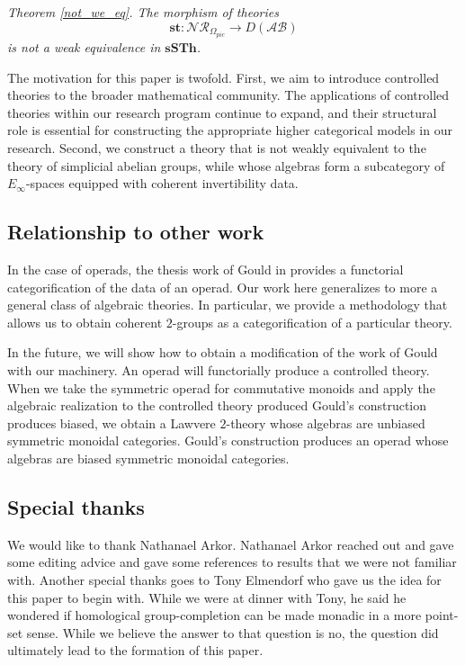 \documentclass{tac}
\begin{document}
\emph{Theorem \ref{not_we_eq}. The morphism of theories
\[
\mathbf{st}:\mathcal{NR}_{\Omega_{pic}}\longrightarrow D(\mathcal{AB})
\]
is not a weak equivalence in $\mathbf{sSTh}$.}

The motivation for this paper is twofold. First, we aim to introduce
controlled theories to the broader mathematical community. The applications of
controlled theories within our research program continue to expand, and their
structural role is essential for constructing the appropriate higher
categorical models in our research. Second, we construct a theory that is not weakly equivalent
to the theory of simplicial abelian groups, while whose algebras form a
subcategory of $E_\infty$-spaces equipped with coherent
invertibility data.

\subsection*{Relationship to other work}
In the case of operads, the thesis work of Gould in \cite{Gould2008} provides a functorial categorification of the data of an operad. Our work here generalizes to more a general class of algebraic theories. In particular, we provide a methodology that allows us to obtain coherent $2$-groups as a categorification of a particular theory.

In the future, we will show how to obtain a modification of the work of Gould with our machinery. An operad will functorially produce a controlled theory. When we take the symmetric operad for commutative monoids and apply the algebraic realization to the controlled theory produced Gould's construction produces biased, we obtain a Lawvere $2$-theory whose algebras are unbiased symmetric monoidal categories. Gould's construction produces an operad whose algebras are biased symmetric monoidal categories. 

\subsection*{Special thanks}
We would like to thank Nathanael Arkor. Nathanael Arkor reached out and gave some editing advice and gave some references to results that we were not familiar with. Another special thanks goes to Tony Elmendorf who gave us the idea for this paper to begin with. While we were at dinner with Tony, he said he wondered if homological group-completion can be made monadic in a more point-set sense. While we believe the answer to that question is no, the question did ultimately lead to the formation of this paper. 
\end{document}
